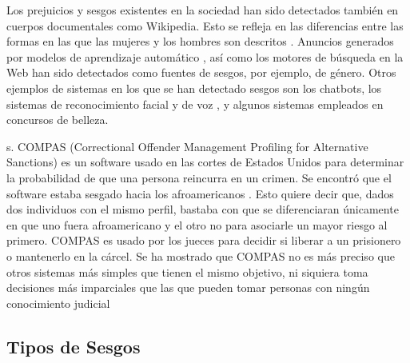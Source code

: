 \documentclass[runningheads,a4paper]{llncs}
\begin{document}
Los prejuicios y sesgos existentes en la sociedad han sido detectados tambi\'en en
cuerpos documentales como Wikipedia. Esto se refleja en las diferencias entre las
formas en las que las mujeres y los hombres son descritos \cite{Claudia}. Anuncios generados
por modelos de aprendizaje autom\'atico \cite{Lat}, así como los motores de b\'usqueda en
la Web \cite{Kay} han sido detectados como fuentes de sesgos, por ejemplo, de g\'enero. Otros
ejemplos de sistemas en los que se han detectado sesgos son los chatbots, los sistemas
de reconocimiento facial y de voz
, y algunos sistemas empleados en concursos de
belleza.

s. COMPAS (Correctional Offender Management
Profiling for Alternative Sanctions) es un software usado en las cortes de Estados
Unidos para determinar la probabilidad de que una persona reincurra en un crimen.
Se encontr\'o que el software estaba sesgado hacia los afroamericanos \cite{Lauren}. Esto quiere
decir que, dados dos individuos con el mismo perfil, bastaba con que se diferenciaran
\'unicamente en que uno fuera afroamericano y el otro no para asociarle un mayor riesgo
al primero. COMPAS es usado por los jueces para decidir si liberar a un prisionero o
mantenerlo en la c\'arcel. Se ha mostrado que COMPAS no es m\'as preciso que otros
sistemas m\'as simples que tienen el mismo objetivo, ni siquiera toma decisiones m\'as
imparciales que las que pueden tomar personas con ning\'un conocimiento judicial \cite{JuliaD}


\subsection{Tipos de Sesgos}
\end{document}
